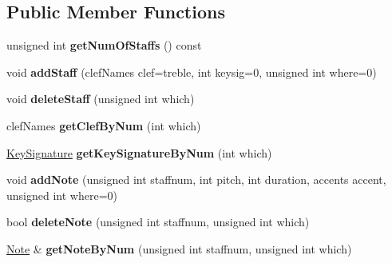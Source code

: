 \subsection*{Public Member Functions}
\begin{DoxyCompactItemize}
\item 
\hypertarget{class_score_view_model_a2e95a5f0786d42535d04eeaa173ef90f}{}unsigned int {\bfseries get\+Num\+Of\+Staffs} () const \label{class_score_view_model_a2e95a5f0786d42535d04eeaa173ef90f}

\item 
\hypertarget{class_score_view_model_aba57d53f1f981ed6426362e72f314112}{}void {\bfseries add\+Staff} (clef\+Names clef=treble, int keysig=0, unsigned int where=0)\label{class_score_view_model_aba57d53f1f981ed6426362e72f314112}

\item 
\hypertarget{class_score_view_model_a48ec38e418000ba3e1f69678eaedaeee}{}void {\bfseries delete\+Staff} (unsigned int which)\label{class_score_view_model_a48ec38e418000ba3e1f69678eaedaeee}

\item 
\hypertarget{class_score_view_model_a89a469259de6149a1eb88faaae00b0b2}{}clef\+Names {\bfseries get\+Clef\+By\+Num} (int which)\label{class_score_view_model_a89a469259de6149a1eb88faaae00b0b2}

\item 
\hypertarget{class_score_view_model_ac8f48528dadb09266ea2f4d4509a5065}{}\hyperlink{class_key_signature}{Key\+Signature} {\bfseries get\+Key\+Signature\+By\+Num} (int which)\label{class_score_view_model_ac8f48528dadb09266ea2f4d4509a5065}

\item 
\hypertarget{class_score_view_model_a72a684c084554c68762d70e5a7bbf09c}{}void {\bfseries add\+Note} (unsigned int staffnum, int pitch, int duration, accents accent, unsigned int where=0)\label{class_score_view_model_a72a684c084554c68762d70e5a7bbf09c}

\item 
\hypertarget{class_score_view_model_a68c1b40e40541dbfc0ffd2194ca5bcb4}{}bool {\bfseries delete\+Note} (unsigned int staffnum, unsigned int which)\label{class_score_view_model_a68c1b40e40541dbfc0ffd2194ca5bcb4}

\item 
\hypertarget{class_score_view_model_a36c92215c16d908f3fd69093e4d307aa}{}\hyperlink{class_note}{Note} \& {\bfseries get\+Note\+By\+Num} (unsigned int staffnum, unsigned int which)\label{class_score_view_model_a36c92215c16d908f3fd69093e4d307aa}


\end{DoxyCompactItemize}
